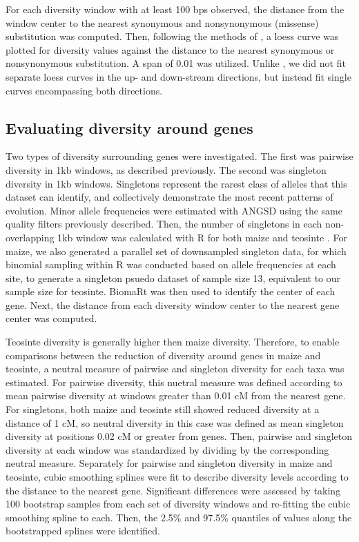 \documentclass{pnastwo}
\begin{document}
\begin{article}
\begin{materials}
For each diversity window with at least 100 bps observed, the distance from the window center to the
nearest synonymous and nonsynonymous (missense) substitution was
computed. Then, following the methods of \cite{hernandez2011}, a loess
curve was plotted for diversity values against the distance to the
nearest synonymous or nonsynonymous substitution. A span of 0.01 was
utilized. Unlike
\cite{sattath2011}, we did not fit separate loess curves in the up- and
down-stream directions, but instead fit single curves encompassing
both directions.

\subsection{Evaluating diversity around genes}
Two types of diversity surrounding genes were investigated. The first
was pairwise diversity in 1kb windows, as described previously. The
second was singleton diversity in 1kb windows. Singletons represent
the rarest class of alleles that this dataset can identify, and
collectively demonstrate the most recent patterns of evolution. Minor
allele frequencies were estimated with ANGSD \cite{korneliussen2014} using the
same quality filters previously described. Then, the number of
singletons in each non-overlapping 1kb window was calculated with R
for both maize and teosinte \cite{R2014}. For maize, we also generated a parallel set of downsampled
singleton data, for which binomial sampling within R was conducted
based on allele frequencies at each site, to generate a singleton
psuedo dataset of sample size 13, equivalent to our sample size for
teosinte. BiomaRt \cite{durinck2009, durinck2005} was then used to identify
the center of each gene. Next, the distance from each diversity window center
to the nearest gene center was computed.

Teosinte diversity is
generally higher then maize diversity. Therefore, to enable comparisons between
the reduction of diversity around genes in maize and teosinte, a
neutral measure of pairwise and singleton diversity for each taxa was
estimated. For pairwise diversity, this nuetral measure was defined according to
mean pairwise diversity at windows greater than 0.01 cM from the nearest
gene. For singletons, both maize and teosinte still showed reduced
diversity at a distance of 1 cM, so neutral diversity in this case was
defined as mean singleton diversity at positions 0.02 cM or greater
from genes. Then, pairwise and singleton diversity at each window was
standardized by dividing by the corresponding neutral
measure. Separately for pairwise and singleton diversity in maize and
teosinte, cubic smoothing splines were fit to
describe diversity levels according to the distance to the nearest
gene. Significant differences were assessed by taking 100 bootstrap
samples from each set of diversity windows and re-fitting the cubic smoothing spline to each. Then, the
2.5\% and 97.5\% quantiles of values along the bootstrapped splines
were identified.


\end{materials}
\end{article}
\end{document}
